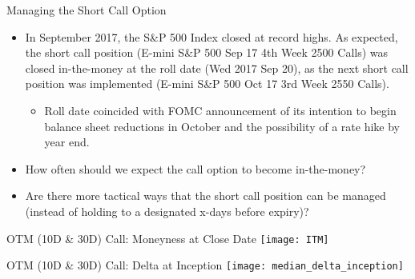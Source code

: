\documentclass{beamer}
\begin{document}
\begin{frame}{Managing the Short Call Option}
\begin{itemize}
\item In September 2017, the S\&P 500 Index closed at record highs. As expected, the short call position (E-mini S\&P 500 Sep 17 4th Week 2500 Calls) was closed in-the-money at the roll date (Wed 2017 Sep 20), as the next short call position was implemented (E-mini S\&P 500 Oct 17 3rd Week 2550 Calls).
	\begin{itemize} 
	\item Roll date coincided with FOMC announcement of its intention to begin balance sheet reductions in October and the possibility of a rate hike by year end.
	\end{itemize}
\vfill
\item How often should we expect the call option to become in-the-money? 
\vfill
\item Are there more tactical ways that the short call position can be managed (instead of holding to a designated x-days before expiry)?

\end{itemize}
\end{frame}

\begin{frame}{OTM (10D \& 30D) Call: Moneyness at Close Date}
\texttt{[image: ITM]}
\end{frame}

\begin{frame}{OTM (10D \& 30D) Call: Delta at Inception}
\texttt{[image: median\_delta\_inception]}
\end{frame}
\end{document}
